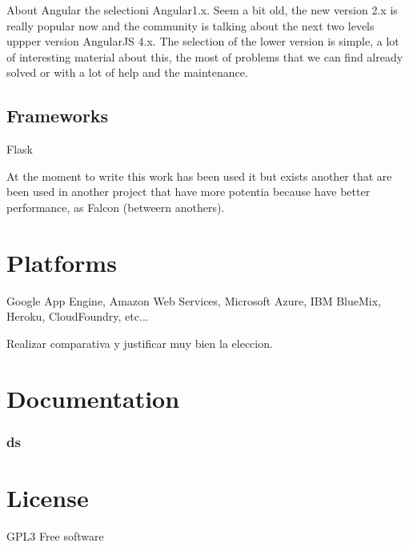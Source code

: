 About Angular the selectioni Angular1.x. Seem a bit old, the new version 2.x
is really popular now and the community is talking about the next two levels
uppper version AngularJS 4.x.
The selection of the lower version is simple, a lot of interesting material
about this, the most of problems that we can find already solved or with a lot
of help and the maintenance.

\subsection{Frameworks}

Flask

At the moment to write this work has been used it but exists another
that are been used in another project that have more potentia because have
better performance, as Falcon (betweern anothers).









\section{Platforms}

Google App Engine, Amazon Web Services, Microsoft Azure, IBM BlueMix,
Heroku, CloudFoundry, etc...

Realizar comparativa y justificar muy bien la eleccion.

\section{Documentation}



\subsubsection {ds}

\section{License}

GPL3 Free software
